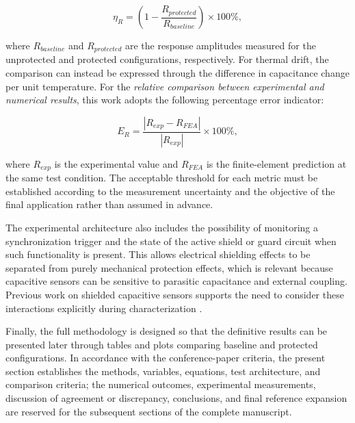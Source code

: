 \documentclass[conference]{IEEEtran}
\begin{document}
\begin{equation}
\eta_R=\left(1-\frac{R_{protected}}{R_{baseline}}\right)\times100\%,
\label{eq:attenuation}
\end{equation}

where $R_{baseline}$ and $R_{protected}$ are the response amplitudes measured for the unprotected and protected configurations, respectively. For thermal drift, the comparison can instead be expressed through the difference in capacitance change per unit temperature. For the \textit{relative comparison between experimental and numerical results}, this work adopts the following percentage error indicator:

\begin{equation}
E_R=\frac{|R_{exp}-R_{FEA}|}{|R_{exp}|}\times100\%,
\label{eq:error}
\end{equation}

where $R_{exp}$ is the experimental value and $R_{FEA}$ is the finite-element prediction at the same test condition. The acceptable threshold for each metric must be established according to the measurement uncertainty and the objective of the final application rather than assumed in advance.

The experimental architecture also includes the possibility of monitoring a synchronization trigger and the state of the active shield or guard circuit when such functionality is present. This allows electrical shielding effects to be separated from purely mechanical protection effects, which is relevant because capacitive sensors can be sensitive to parasitic capacitance and external coupling. Previous work on shielded capacitive sensors supports the need to consider these interactions explicitly during characterization \cite{Aksoy2022,Ye2025}.

Finally, the full methodology is designed so that the definitive results can be presented later through tables and plots comparing baseline and protected configurations. In accordance with the conference-paper criteria, the present section establishes the methods, variables, equations, test architecture, and comparison criteria; the numerical outcomes, experimental measurements, discussion of agreement or discrepancy, conclusions, and final reference expansion are reserved for the subsequent sections of the complete manuscript.


\balance


\end{document}
